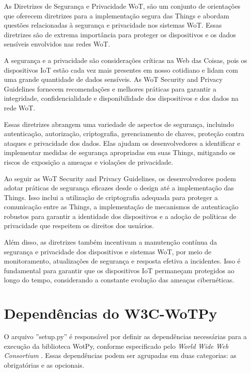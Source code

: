 As Diretrizes de Segurança e Privacidade WoT, são um conjunto de orientações que oferecem diretrizes para a implementação segura das Things e abordam questões relacionadas à segurança e privacidade nos sistemas WoT. Essas diretrizes são de extrema importância para proteger os dispositivos e os dados sensíveis envolvidos nas redes WoT.

A segurança e a privacidade são considerações críticas na Web das Coisas, pois os dispositivos IoT estão cada vez mais presentes em nosso cotidiano e lidam com uma grande quantidade de dados sensíveis. As WoT Security and Privacy Guidelines fornecem recomendações e melhores práticas para garantir a integridade, confidencialidade e disponibilidade dos dispositivos e dos dados na rede WoT.

Essas diretrizes abrangem uma variedade de aspectos de segurança, incluindo autenticação, autorização, criptografia, gerenciamento de chaves, proteção contra ataques e privacidade dos dados. Elas ajudam os desenvolvedores a identificar e implementar medidas de segurança apropriadas em suas Things, mitigando os riscos de exposição a ameaças e violações de privacidade.

Ao seguir as WoT Security and Privacy Guidelines, os desenvolvedores podem adotar práticas de segurança eficazes desde o design até a implementação das Things. Isso inclui a utilização de criptografia adequada para proteger a comunicação entre as Things, a implementação de mecanismos de autenticação robustos para garantir a identidade dos dispositivos e a adoção de políticas de privacidade que respeitem os direitos dos usuários.

Além disso, as diretrizes também incentivam a manutenção contínua da segurança e privacidade dos dispositivos e sistemas WoT, por meio de monitoramento, atualizações de segurança e resposta efetiva a incidentes. Isso é fundamental para garantir que os dispositivos IoT permaneçam protegidos ao longo do tempo, considerando a constante evolução das ameaças cibernéticas.

\section{Dependências do W3C-WoTPy}

O arquivo ''setup.py''  é responsável por definir as dependências necessárias para a execução da biblioteca WotPy, conforme especificado pelo \textit{World Wide Web Consortium} \cite{Architecture}. Essas dependências podem ser agrupadas em duas categorias: as obrigatórias e as opcionais.

